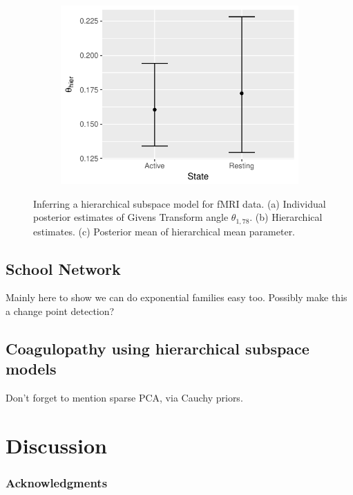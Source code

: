 \documentclass{article}
\begin{document}
\begin{figure}
    \begin{subfigure}[b]{0.3\textwidth}
        \includegraphics[width=\textwidth]{hierMean.pdf}
        \caption{}
        \label{fig:AreaForm}
    \end{subfigure}
    \caption{Inferring a hierarchical subspace model for fMRI data. (a) Individual posterior estimates of Givens Transform angle $\theta_{1,78}$. (b) Hierarchical estimates. (c) Posterior mean of hierarchical mean parameter.}\label{fig:fmri}
\end{figure}


\subsection{School Network}
Mainly here to show we can do exponential families easy too. Possibly make this a change point detection?

\subsection{Coagulopathy using hierarchical subspace models}
Don't forget to mention sparse PCA, via Cauchy priors.

\section{Discussion}

\subsubsection*{Acknowledgments}
\end{document}
